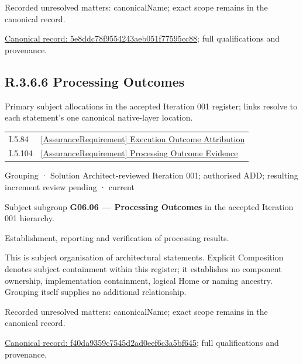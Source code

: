 {\small Recorded unresolved matters: canonicalName; exact scope remains in the canonical record.}\par
{\footnotesize \href{../../../../continuum/grouping/5e8ddc78f9554243aeb051f77595cc88.md}{Canonical record: 5e8ddc78f9554243aeb051f77595cc88}; full qualifications and provenance.}\par
\subsection*{R.3.6.6 Processing Outcomes}
\label{navigation:R.3.6.6}

Primary subject allocations in the accepted Iteration 001 register; links resolve to each statement’s one canonical native-layer location.\par
\begin{longtable}{p{.22\linewidth}p{.73\linewidth}}
I.5.84 & \hyperref[element:79177908b67243a4a5f86fa180f5fd22]{[AssuranceRequirement] Execution Outcome Attribution} \\
I.5.104 & \hyperref[element:8ac5880576ad4f8fa9612f231178a06c]{[AssuranceRequirement] Processing Outcome Evidence} \\
\end{longtable}
\label{element:f40da9359c7545d2ad0eef6c3a5bf645}
{\small Grouping · Solution Architect-reviewed Iteration 001; authorised ADD; resulting increment review pending · current}\par

Subject subgroup \textbf{G06.06 — Processing Outcomes} in the accepted Iteration 001 hierarchy.



Establishment, reporting and verification of processing results.



This is subject organisation of architectural statements. Explicit Composition denotes subject containment within this register; it establishes no component ownership, implementation containment, logical Home or naming ancestry. Grouping itself supplies no additional relationship.


{\small Recorded unresolved matters: canonicalName; exact scope remains in the canonical record.}\par
{\footnotesize \href{../../../../continuum/grouping/f40da9359c7545d2ad0eef6c3a5bf645.md}{Canonical record: f40da9359c7545d2ad0eef6c3a5bf645}; full qualifications and provenance.}\par
